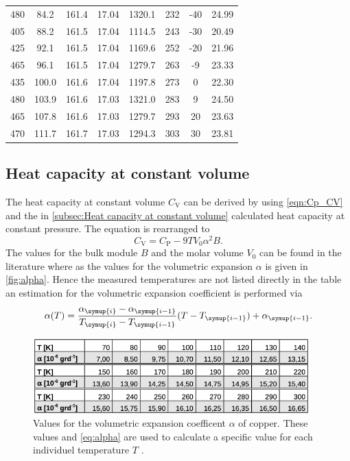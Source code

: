 \begin{table}
\begin{tabular}{S S S S | S S S | S}
    480 &  84.2 &  161.4  & 17.04 & 1320.1 & 232 & -40  & 24.99 \\
    405 &  88.2 &  161.5  & 17.04 & 1114.5 & 243 & -30  & 20.49 \\
    425 &  92.1 &  161.5  & 17.04 & 1169.6 & 252 & -20  & 21.96 \\
    465 &  96.1 &  161.5  & 17.04 & 1279.7 & 263 & -9   & 23.33 \\
    435 & 100.0 &  161.6  & 17.04 & 1197.8 & 273 & 0    & 22.30 \\
    480 & 103.9 &  161.6  & 17.03 & 1321.0 & 283 & 9    & 24.50 \\
    465 & 107.8 &  161.6  & 17.03 & 1279.7 & 293 & 20   & 23.63 \\
    470 & 111.7 &  161.7  & 17.03 & 1294.3 & 303 & 30   & 23.81 \\
    \bottomrule
  \end{tabular}
\end{table}

\subsection{Heat capacity at constant volume}
The heat capacity at constant volume $C_\mathrm{V}$ can be derived by using \autoref{eqn:Cp_CV} and the in \autoref{subsec:Heat capacity at constant volume}
calculated heat capacity at constant pressure. The equation is rearranged to
\begin{equation*}
  C_\mathrm{V} = C_\mathrm{P} - 9 T V_0 \alpha^2 B.
\end{equation*}
The values for the bulk module $B$ and the molar volume $V_0$ can be found in the literature where as the values for the volumetric expansion $\alpha$ is given
in \autoref{fig:alpha}. Hence the measured temperatures are not listed directly in the table an estimation for the volumetric expansion coefficient is performed
via
\begin{equation}
  \alpha (T) = \frac{\alpha_{\symup{i}}-\alpha_{\symup{i-1}}} {T_{\symup{i}}-T_{\symup{i-1}}} (T-T_{\symup{i-1}}) + \alpha_{\symup{i-1}}.
  \label{eq:alpha}
\end{equation}

\begin{figure}
  \centering
  \includegraphics[width = 0.95\textwidth]{content/pics/alpha.png}
  \caption{Values for the volumetric expansion coefficent $\alpha$ of copper. These values and \autoref{eq:alpha} are used to calculate a specific %
  value for each individuel temperature $T$ \cite{V47}.}
  \label{fig:alpha}
\end{figure}

